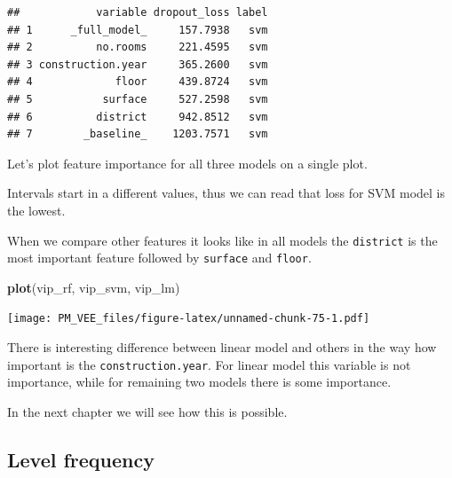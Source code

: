 \documentclass[12pt,]{krantz}
\newenvironment{Shaded}{\begin{snugshade}}{\end{snugshade}}
\newcommand{\DataTypeTok}[1]{\textcolor[rgb]{0.13,0.29,0.53}{#1}}
\newcommand{\DecValTok}[1]{\textcolor[rgb]{0.00,0.00,0.81}{#1}}
\newcommand{\KeywordTok}[1]{\textcolor[rgb]{0.13,0.29,0.53}{\textbf{#1}}}
\newcommand{\NormalTok}[1]{#1}
\newcommand{\OperatorTok}[1]{\textcolor[rgb]{0.81,0.36,0.00}{\textbf{#1}}}
\newcommand{\StringTok}[1]{\textcolor[rgb]{0.31,0.60,0.02}{#1}}
\theoremstyle{definition}
\theoremstyle{definition}
\theoremstyle{definition}
\theoremstyle{remark}
\begin{document}
\begin{Shaded}
\end{Shaded}

\begin{verbatim}
##            variable dropout_loss label
## 1      _full_model_     157.7938   svm
## 2          no.rooms     221.4595   svm
## 3 construction.year     365.2600   svm
## 4             floor     439.8724   svm
## 5           surface     527.2598   svm
## 6          district     942.8512   svm
## 7        _baseline_    1203.7571   svm
\end{verbatim}

Let's plot feature importance for all three models on a single plot.

Intervals start in a different values, thus we can read that loss for
SVM model is the lowest.

When we compare other features it looks like in all models the
\texttt{district} is the most important feature followed by
\texttt{surface} and \texttt{floor}.

\begin{Shaded}
\begin{Highlighting}[]
\KeywordTok{plot}\NormalTok{(vip_rf, vip_svm, vip_lm)}
\end{Highlighting}
\end{Shaded}

\texttt{[image: PM\_VEE\_files/figure-latex/unnamed-chunk-75-1.pdf]}

There is interesting difference between linear model and others in the
way how important is the \texttt{construction.year}. For linear model
this variable is not importance, while for remaining two models there is
some importance.

In the next chapter we will see how this is possible.

\hypertarget{level-frequency}{%
\subsection{Level frequency}\label{level-frequency}}
\end{document}
